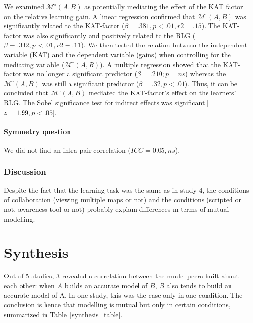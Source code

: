 \documentclass[natbib]{svjour3}
\newcommand{\gmodel}[2]{{$\mathcal{M}(#1, #2)$}}
\newcommand{\gModel}[2]{{$\mathcal{M}^{\circ}(#1, #2)$}}
\begin{document}
We examined \gModel{A}{B} as potentially mediating the effect of the KAT factor
on the relative learning gain. A linear regression confirmed that \gModel{A}{B}
was significantly related to the KAT-factor ($\beta= .381, p < .01, r2 = .15$).
The KAT-factor was also significantly and positively related to the RLG ($\beta=
.332, p < .01, r2 = .11$). We then tested the relation between the independent
variable (KAT) and the dependent variable (gains) when controlling for the
mediating variable (\gModel{A}{B}). A multiple regression showed that the
KAT-factor was no longer a significant predictor ($\beta= .210; p = ns$) whereas
the \gModel{A}{B} was still a significant predictor ($\beta= .32, p < .01$).
Thus, it can be concluded that \gModel{A}{B} mediated the KAT-factor's effect on
the learners' RLG. The Sobel significance test for indirect effects was
significant [$z = 1.99, p < .05$]. 

\paragraph{Symmetry question} We did not find an intra-pair correlation ($ICC =
0.05, ns$).


\subsubsection*{Discussion}

Despite the fact that the learning task was the same as in study 4, the
conditions of collaboration (viewing multiple maps or not) and the conditions
(scripted or not, awareness tool or not) probably explain differences in terms
of mutual modelling.

\section{Synthesis}

Out of 5 studies, 3 revealed a correlation between the model peers built about
each other: when $A$ builds an accurate model of $B$, $B$ also tends to build an
accurate model of A.  In one study, this was the case only in one condition.
The conclusion is hence that modelling is mutual but only in certain conditions,
summarized in Table~\ref{synthesis_table}.
\end{document}
